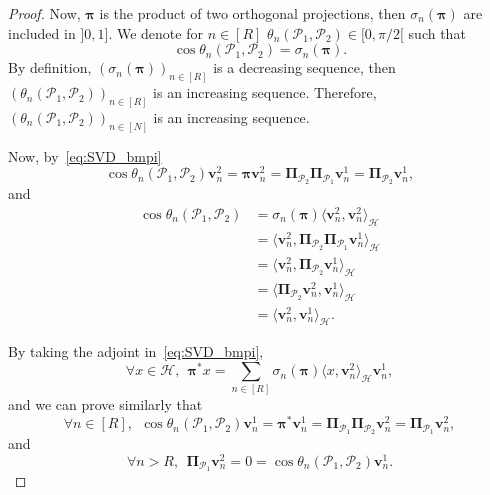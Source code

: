 \documentclass[twoside,11pt]{book}
\numberwithin{theorem}{chapter}
\numberwithin{definition}{chapter}
\numberwithin{proposition}{chapter}
\numberwithin{corollary}{chapter}
\numberwithin{example}{chapter}
\numberwithin{lemma}{chapter}
\numberwithin{assumption}{chapter}
\numberwithin{equation}{chapter}
\numberwithin{figure}{chapter}
\begin{document}
\begin{proof}

Now, $\bm{\pi}$ is the product of two orthogonal projections, then $\sigma_{n}(\bm{\pi})$ are included in $]0,1]$. We denote for $n \in [R]$ $\theta_{n}(\mathcal{P}_1,\mathcal{P}_2) \in [0,\pi/2[$ such that
\begin{equation}
\cos \theta_n(\mathcal{P}_1,\mathcal{P}_2) = \sigma_{n}(\bm{\pi}).
\end{equation}
By definition, $(\sigma_{n}(\bm{\pi}))_{n \in [R]}$ is a decreasing sequence, then $(\theta_{n}(\mathcal{P}_1,\mathcal{P}_2))_{n \in [R]}$ is an increasing sequence. Therefore, $(\theta_{n}(\mathcal{P}_1,\mathcal{P}_2))_{n \in [N]}$
is an increasing sequence.

Now, by~\eqref{eq:SVD_bmpi}
\begin{equation}
\cos \theta_n(\mathcal{P}_1,\mathcal{P}_2) \bm{v}^{2}_{n} = \bm{\pi} \bm{v}^{2}_{n} = \bm{\Pi}_{\mathcal{P}_{2}} \bm{\Pi}_{\mathcal{P}_{1}} \bm{v}^{1}_{n} = \bm{\Pi}_{\mathcal{P}_{2}} \bm{v}^{1}_{n},
\end{equation}
and
\begin{align}
\cos \theta_n(\mathcal{P}_1,\mathcal{P}_2) & = \sigma_n(\bm{\pi}) \langle \bm{v}^{2}_{n}, \bm{v}^{2}_{n} \rangle_{\mathcal{H}} \nonumber \\
& = \langle \bm{v}^{2}_{n},\bm{\Pi}_{\mathcal{P}_2} \bm{\Pi}_{\mathcal{P}_1} \bm{v}^{1}_{n}\rangle_{\mathcal{H}} \nonumber \\
& = \langle \bm{v}^{2}_{n}, \bm{\Pi}_{\mathcal{P}_2} \bm{v}^{1}_{n} \rangle_{\mathcal{H}} \nonumber \\
& = \langle \bm{\Pi}_{\mathcal{P}_2} \bm{v}^{2}_{n},  \bm{v}^{1}_{n} \rangle_{\mathcal{H}} \nonumber \\
& = \langle \bm{v}^{2}_{n},  \bm{v}^{1}_{n} \rangle_{\mathcal{H}}.
\end{align}

By taking the adjoint in~\eqref{eq:SVD_bmpi}, 
\begin{equation}
\forall x \in \mathcal{H}, \:\: \bm{\pi}^{*} x = \sum\limits_{n \in [R]} \sigma_{n}(\bm{\pi}) \langle x,\bm{v}^{2}_{n} \rangle_{\mathcal{H}} \bm{v}^{1}_{n},
\end{equation}
and we can prove similarly that
\begin{equation}
\forall n \in [R], \:\:\cos \theta_n(\mathcal{P}_1,\mathcal{P}_2) \bm{v}^{1}_{n} = \bm{\pi}^{*} \bm{v}^{1}_{n} = \bm{\Pi}_{\mathcal{P}_{1}} \bm{\Pi}_{\mathcal{P}_{2}} \bm{v}^{2}_{n} = \bm{\Pi}_{\mathcal{P}_{1}} \bm{v}^{2}_{n},
\end{equation}
and
\begin{equation}
\forall n >R, \:\:\bm{\Pi}_{\mathcal{P}_{1}} \bm{v}^{2}_{n} = 0 = \cos \theta_{n}(\mathcal{P}_1,\mathcal{P}_2) \bm{v}^{1}_{n}.
\end{equation}


\end{proof}
\end{document}
